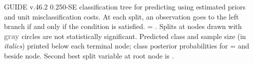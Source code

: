 \documentclass[12pt]{article}
\begin{document}
 \begin{center}
 \end{center}
GUIDE v.46.2 0.250-SE
classification tree for predicting \texttt{} using
estimated priors
and unit misclassification costs.
At each split, an observation goes to the left branch 
 if and only if the condition is satisfied.
\texttt{} = \texttt{}.
 Splits at nodes drawn with \textbf{\textcolor{gray}{gray}} circles are not statistically significant.
Predicted class and sample size (in \emph{italics}) printed below each terminal node;
class posterior probabilities for \texttt{} =
 \texttt{} and \texttt{} beside node.
 Second best split variable at root node is \texttt{}.
 
\end{document}
